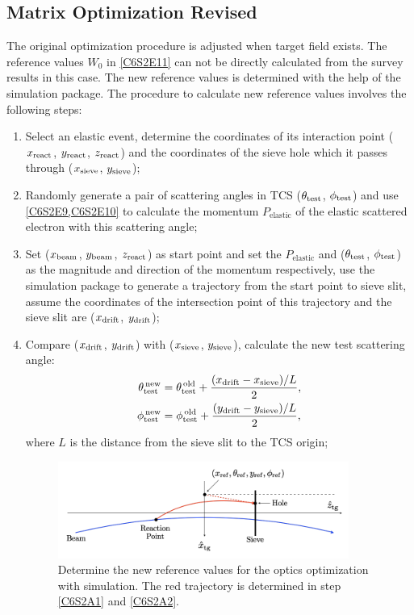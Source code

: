 \subsection{Matrix Optimization Revised}
\label{C6S2SS4}

The original optimization procedure is adjusted when target field exists. The reference values $W_0$ in \cref{C6S2E11} can not be directly calculated from the survey results in this case. The new reference values is determined with the help of the simulation package. The procedure to calculate new reference values involves the following steps:
\begin{enumerate}[parsep=0pt]
\item Select an elastic event, determine the coordinates of its interaction point ($x_{\mathrm{react}}$, $y_{\mathrm{react}}$, $z_{\mathrm{react}}$) and the coordinates of the sieve hole which it passes through ($x_{\mathrm{sieve}}$, $y_{\mathrm{sieve}}$);
\item Randomly generate a pair of scattering angles in TCS ($\theta_{\mathrm{test}}$, $\phi_{\mathrm{test}}$) and use \cref{C6S2E9,C6S2E10} to calculate the momentum $P_{\mathrm{elastic}}$ of the elastic scattered electron with this scattering angle;
\item \label{C6S2A1}Set ($x_{\mathrm{beam}}$, $y_{\mathrm{beam}}$, $z_{\mathrm{react}}$) as start point and set the $P_{\mathrm{elastic}}$ and ($\theta_{\mathrm{test}}$, $\phi_{\mathrm{test}}$) as the magnitude and direction of the momentum respectively, use the simulation package to generate a trajectory from the start point to sieve slit, assume the coordinates of the intersection point of this trajectory and the sieve slit are ($x_{\mathrm{drift}}$, $y_{\mathrm{drift}}$);
\item \label{C6S2A2}Compare ($x_{\mathrm{drift}}$, $y_{\mathrm{drift}}$) with ($x_{\mathrm{sieve}}$, $y_{\mathrm{sieve}}$), calculate the new test scattering angle:
\begin{align} \label{C6S2E12}
\theta_{\mathrm{test}}^{\,\mathrm{new}} & = \theta_{\mathrm{test}}^{\,\mathrm{old}}+\frac{(x_{\mathrm{drift}}-x_{\mathrm{sieve}})/L}{2}, \\ \label{C6S2E13}
\phi_{\mathrm{test}}^{\,\mathrm{new}} & = \phi_{\mathrm{test}}^{\,\mathrm{old}}+\frac{(y_{\mathrm{drift}}-y_{\mathrm{sieve}})/L}{2},
\end{align}
where $L$ is the distance from the sieve slit to the TCS origin;

\begin{figure}[tb!]
  \centering
  \includegraphics[width=0.9\textwidth]{figs/optics-reference-value.png}
  \caption[Determine the new reference values for the optics optimization.]{Determine the new reference values for the optics optimization with simulation. The red trajectory is determined in step \ref{C6S2A1} and \ref{C6S2A2}. \label{C6S2F3}}
\end{figure}


\end{enumerate}
